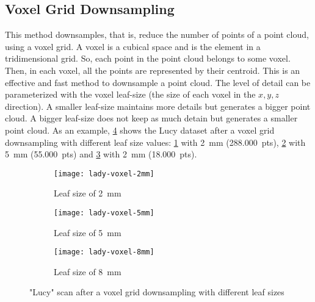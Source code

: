 \subsection{Voxel Grid Downsampling}

This method downsamples, that is, reduce the number of points of a point cloud, using a voxel grid. A voxel is a cubical space and is the element in a tridimensional grid. So, each point in the point cloud belongs to some voxel. Then, in each voxel, all the points are represented by their centroid. This is an effective and fast method to downsample a point cloud. The level of detail can be parameterized with the voxel leaf-size (the size of each voxel in the $x,y,z$ direction). A smaller leaf-size maintains more details but generates a bigger point cloud. A bigger leaf-size does not keep as much detain but generates a smaller point cloud. As an example, \cref{figure:lucy-voxel-grid} shows the Lucy dataset after a voxel grid downsampling with different leaf size values: \cref{figure:lucy-voxel-grid-2mm} with \SI{2}{\milli\meter} (288.000~pts), \cref{figure:lucy-voxel-grid-5mm} with \SI{5}{\milli\meter} (55.000~pts) and \cref{figure:lucy-voxel-grid-8mm} with \SI{2}{\milli\meter} (18.000~pts).

\begin{figure}[h]
    
    \centering
    \begin{subfigure}[t]{0.3\textwidth}
        \centering
        \texttt{[image: lady-voxel-2mm]}
        \caption{Leaf size of \SI{2}{\milli\meter}}
        \label{figure:lucy-voxel-grid-2mm}
    \end{subfigure}%
    \begin{subfigure}[t]{0.3\textwidth}
        \centering
        \texttt{[image: lady-voxel-5mm]}
        \caption{Leaf size of \SI{5}{\milli\meter}}
        \label{figure:lucy-voxel-grid-5mm}
    \end{subfigure}%
    \begin{subfigure}[t]{0.3\textwidth}
        \centering
        \texttt{[image: lady-voxel-8mm]}
        \caption{Leaf size of \SI{8}{\milli\meter}}
        \label{figure:lucy-voxel-grid-8mm}
    \end{subfigure}

    \caption{"Lucy" scan after a voxel grid downsampling with different leaf sizes}
    \label{figure:lucy-voxel-grid}
\end{figure}